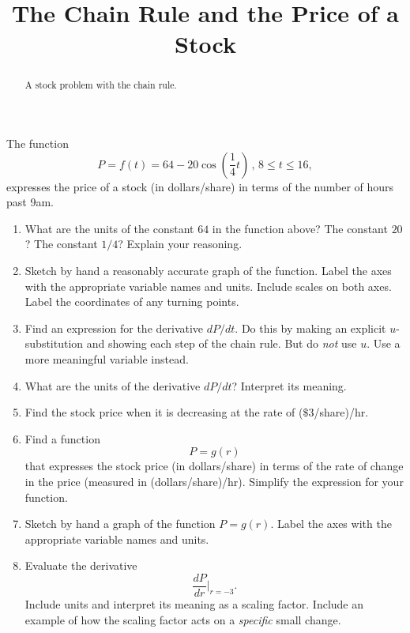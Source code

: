 \documentclass{ximera}
\title{The Chain Rule and the Price of a Stock}
\begin{document}
\begin{abstract}
A stock problem with the chain rule.
\end{abstract}
\maketitle


\begin{question} \label{QLfel33mz}
The function
\[
     P = f(t) = 64 - 20\cos\left(  \frac{1}{4} t \right) \, , \, 8\leq t \leq 16,
\]
expresses the price of a stock (in dollars/share) in terms of the number of hours past 9am.

\begin{enumerate}

\item What are the units of the constant $64$ in the function above? The constant $20$? The constant $1/4$? Explain your reasoning.

\item Sketch by hand a reasonably accurate graph of the function. Label the axes with the appropriate variable names and units. Include scales on both axes. Label the coordinates of any turning points.

\item Find an expression for the derivative $dP/dt$. Do this by making an explicit $u$-substitution and showing each step of the chain rule. But do \emph{not} use $u$. Use a more meaningful variable instead.

\item What are the units of the derivative $dP/dt$? Interpret its meaning.

\item Find the stock price when it is decreasing at the rate of ($\$3$/share)/hr.

\item Find a function 
\[
   P = g(r)
\]
that expresses the stock price (in dollars/share) in terms of the rate of change in the price (measured in (dollars/share)/hr). Simplify the expression for your function.

\item Sketch by hand a graph of the function $P=g(r)$. Label the axes with the appropriate variable names and units. 

\item Evaluate the derivative 
\[
  \frac{dP}{dr}\Big|_{r=-3}.
\] 
Include units and interpret its meaning as a scaling factor. Include an example of how the scaling factor acts on a \emph{specific} small change.


\end{enumerate}
\end{question}
\end{document}
